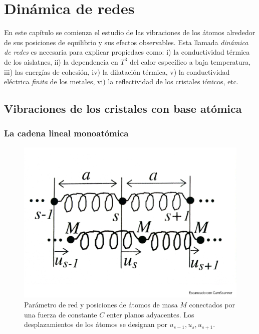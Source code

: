 
\chapter{Dinámica de redes} \label{Ch:04}

En este capítulo se comienza el estudio de las vibraciones de los átomos alrededor de sus posiciones de equilibrio y sus efectos observables. Esta llamada \textit{dinámica de redes} es necesaria para explicar propiedaes como: i) la conductividad térmica de los aislatnes, ii) la dependencia en $T^3$ del calor específico a baja temperatura, iii) las energías de cohesión, iv) la dilatación térmica, v) la conductividad eléctrica \textit{finita} de los metales, vi) la reflectividad de los cristales iónicos, etc.


\section{Vibraciones de los cristales con base atómica}

\subsection{La cadena lineal monoatómica}

\begin{figure}[h!] \centering
    \includegraphics[scale=0.5]{Cuerpo/Ch_04/Fotos libro 1.pdf}
    \caption{Parámetro de red y posiciones de átomos de masa $M$ conectados por una fuerza de constante $C$ enter planos adyacentes. Los desplazamientos de los átomos se designan por $u_{s-1},u_{s},u_{s+1}$.}
    \label{Fig:04-01}
\end{figure}    

